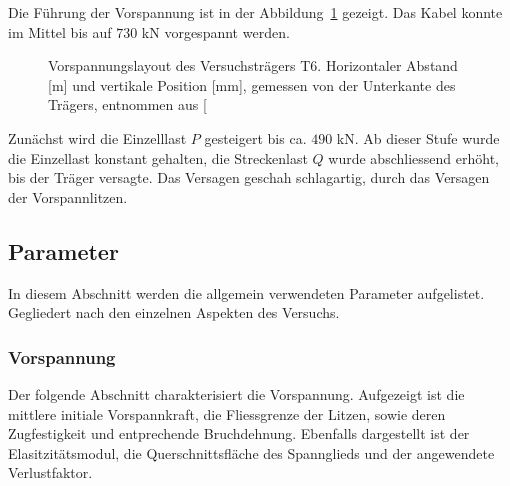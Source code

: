 \documentclass[
  11pt,
  letterpaper,
]{scrreprt}
\begin{document}
Die Führung der Vorspannung ist in der
Abbildung~\ref{fig-vorspannung_t6} gezeigt. Das Kabel konnte im Mittel
bis auf \(730\) kN vorgespannt werden.

\begin{figure}[H]


\caption{\label{fig-vorspannung_t6}Vorspannungslayout des
Versuchsträgers T6. Horizontaler Abstand {[}m{]} und vertikale Position
{[}mm{]}, gemessen von der Unterkante des Trägers, entnommen aus
{[}\citeproc{ref-sigrist_versuche_1993}{5}{]}}

\end{figure}%

Zunächst wird die Einzelllast \(P\) gesteigert bis ca. \(490\) kN. Ab
dieser Stufe wurde die Einzellast konstant gehalten, die Streckenlast
\(Q\) wurde abschliessend erhöht, bis der Träger versagte. Das Versagen
geschah schlagartig, durch das Versagen der Vorspannlitzen.

\subsection{Parameter}\label{parameter}

In diesem Abschnitt werden die allgemein verwendeten Parameter
aufgelistet. Gegliedert nach den einzelnen Aspekten des Versuchs.

\subsubsection{Vorspannung}\label{vorspannung}

Der folgende Abschnitt charakterisiert die Vorspannung. Aufgezeigt ist
die mittlere initiale Vorspannkraft, die Fliessgrenze der Litzen, sowie
deren Zugfestigkeit und entprechende Bruchdehnung. Ebenfalls dargestellt
ist der Elasitzitätsmodul, die Querschnittsfläche des Spannglieds und
der angewendete Verlustfaktor.
\end{document}
